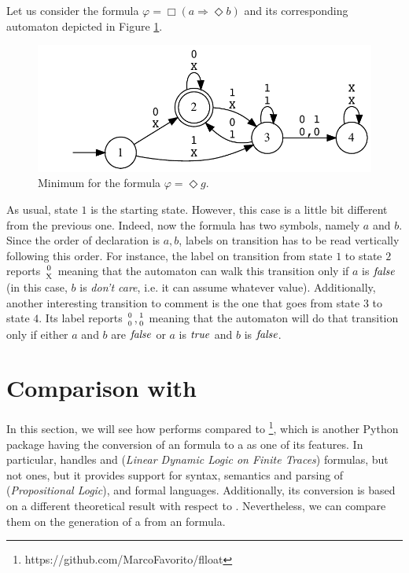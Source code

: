 \begin{example}
Let us consider the formula $\varphi = \Box (a \Rightarrow \Diamond b)$ and its corresponding automaton depicted in Figure \ref{fig:automa-example2}.
\begin{figure}[h]
\centering
\includegraphics{images/example2-output.eps}
\caption{Minimum \DFA for the formula $\varphi = \Diamond g$.} 
\label{fig:automa-example2}
\end{figure}
As usual, state $1$ is the starting state. However, this case is a little bit different from the previous one. Indeed, now the formula has two symbols, namely $a$ and $b$. Since the order of declaration is $a,b$, labels on transition has to be read vertically following this order. For instance, the label on transition from state $1$ to state $2$ reports $0 \atop \text{X}$ meaning that the automaton can walk this transition only if $a$ is $\mathit{false}$ (in this case, $b$ is \emph{don't care}, i.e. it can assume whatever value). Additionally, another interesting transition to comment is the one that goes from state $3$ to state $4$. Its label reports $0 \atop 0$,$1 \atop 0$ meaning that the automaton will do that transition only if either $a$ and $b$ are $\mathit{false}$ or $a$ is $\mathit{true}$ and $b$ is $\mathit{false}$.
\end{example} 
\section{Comparison with \FLLOAT}
In this section, we will see how \LTLfToDFA performs compared to \href{https://pypi.org/project/flloat/}{\FLLOAT}\footnote{https://github.com/MarcoFavorito/flloat}, which is another Python package having the conversion of an \LTLf formula to a \DFA as one of its features.
In particular, \FLLOAT handles \LTLf and \LDLf (\textit{Linear Dynamic Logic on Finite Traces}) formulas, but not \PLTL ones, but it provides support for syntax, semantics and parsing of \PL (\textit{Propositional Logic}), \LTLf and \LDLf formal languages.  Additionally, its conversion is based on a different theoretical result with respect to \LTLfToDFA. Nevertheless, we can compare them on the generation of a \DFA from an \LTLf formula.

